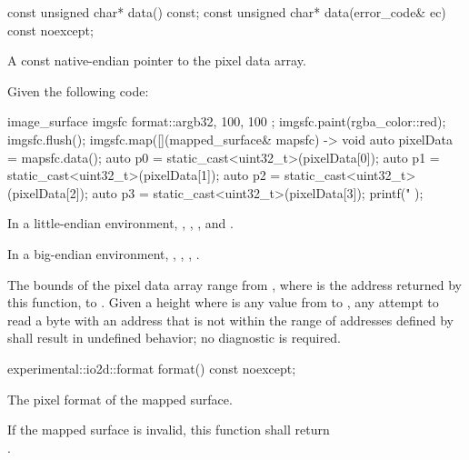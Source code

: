 \begin{itemdecl}
const unsigned char* data() const;
const unsigned char* data(error_code& ec) const noexcept;
\end{itemdecl}
\begin{itemdescr}
\pnum
\returns
A const native-endian pointer to the pixel data array.
\begin{example}
Given the following code:

\begin{codeblock}
image_surface imgsfc{ format::argb32, 100, 100 };
imgsfc.paint(rgba_color::red);
imgsfc.flush();
imgsfc.map([](mapped_surface& mapsfc) -> void {
    auto pixelData = mapsfc.data();
    auto p0 = static_cast<uint32_t>(pixelData[0]);
    auto p1 = static_cast<uint32_t>(pixelData[1]);
    auto p2 = static_cast<uint32_t>(pixelData[2]);
    auto p3 = static_cast<uint32_t>(pixelData[3]);
    printf("%
});
\end{codeblock}

In a little-endian environment, , , , and .

In a big-endian environment, , , , .
\end{example}

\pnum
\remarks
The bounds of the pixel data array range from , where  is the address returned by this function, to . Given a height  where  is any value from  to , any attempt to read a byte with an address that is not within the range of addresses defined by  shall result in undefined behavior; no diagnostic is required.
\end{itemdescr}

\begin{itemdecl}
experimental::io2d::format format() const noexcept;
\end{itemdecl}
\begin{itemdescr}
\pnum
\returns
The pixel format of the mapped surface.

\pnum
\remarks
If the mapped surface is invalid, this function shall return \\
.
\end{itemdescr}

